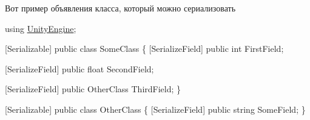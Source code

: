 Вот пример объявления класса, который можно сериализовать


\begin{DoxyCode}
\textcolor{keyword}{using} \hyperlink{namespace_unity_engine}{UnityEngine};

[Serializable]
\textcolor{keyword}{public} \textcolor{keyword}{class }SomeClass
\{
    [SerializeField]
    \textcolor{keyword}{public} \textcolor{keywordtype}{int} FirstField;

    [SerializeField]
    \textcolor{keyword}{public} \textcolor{keywordtype}{float} SecondField;

    [SerializeField]
    \textcolor{keyword}{public} OtherClass ThirdField;
\}

[Serializable]
\textcolor{keyword}{public} \textcolor{keyword}{class }OtherClass
\{
    [SerializeField]
    \textcolor{keyword}{public} \textcolor{keywordtype}{string} SomeField;
\}
\end{DoxyCode}
 